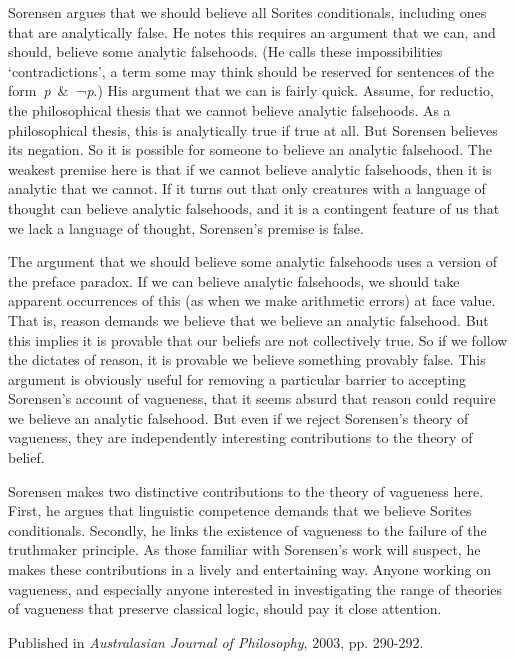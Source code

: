 \documentclass[
  11pt,
  letterpaper,
  DIV=11,
  numbers=noendperiod,
  twoside]{scrartcl}
\begin{document}
Sorensen argues that we should believe all Sorites conditionals,
including ones that are analytically false. He notes this requires an
argument that we can, and should, believe some analytic falsehoods. (He
calls these impossibilities `contradictions', a term some may think
should be reserved for sentences of the form~\emph{p}~\&~¬\emph{p}.) His
argument that we can is fairly quick. Assume, for reductio, the
philosophical thesis that we cannot believe analytic falsehoods. As a
philosophical thesis, this is analytically true if true at all. But
Sorensen believes its negation. So it is possible for someone to believe
an analytic falsehood. The weakest premise here is that if we cannot
believe analytic falsehoods, then it is analytic that we cannot. If it
turns out that only creatures with a language of thought can believe
analytic falsehoods, and it is a contingent feature of us that we lack a
language of thought, Sorensen's premise is false.

The argument that we should believe some analytic falsehoods uses a
version of the preface paradox. If we can believe analytic falsehoods,
we should take apparent occurrences of this (as when we make arithmetic
errors) at face value. That is, reason demands we believe that we
believe an analytic falsehood. But this implies it is provable that our
beliefs are not collectively true. So if we follow the dictates of
reason, it is provable we believe something provably false. This
argument is obviously useful for removing a particular barrier to
accepting Sorensen's account of vagueness, that it seems absurd that
reason could require we believe an analytic falsehood. But even if we
reject Sorensen's theory of vagueness, they are independently
interesting contributions to the theory of belief.

Sorensen makes two distinctive contributions to the theory of vagueness
here. First, he argues that linguistic competence demands that we
believe Sorites conditionals. Secondly, he links the existence of
vagueness to the failure of the truthmaker principle. As those familiar
with Sorensen's work will suspect, he makes these contributions in a
lively and entertaining way. Anyone working on vagueness, and especially
anyone interested in investigating the range of theories of vagueness
that preserve classical logic, should pay it close attention.

\vspace{1cm}



\noindent Published in\emph{
Australasian Journal of Philosophy}, 2003, pp. 290-292.
\end{document}
